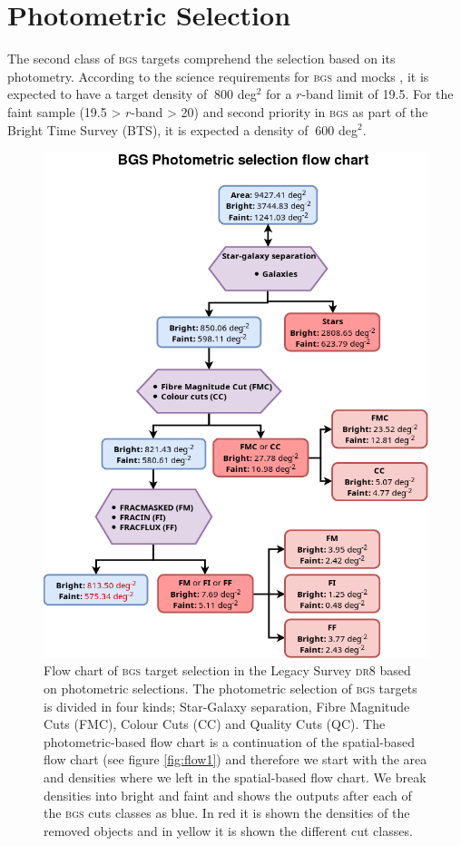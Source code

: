 \documentclass[fleqn,usenatbib]{mnras}
\newcommand{\BGS}{\textsc{bgs}\xspace}
\newcommand{\DReight}{\textsc{dr8}\xspace}
\begin{document}
\section{Photometric Selection}\label{sec:photo_select}

The second class of \BGS targets comprehend the selection based on its photometry. According to the science requirements for \BGS and mocks \citep{Smith:2017tzz}, it is expected to have a target density of $~800$ deg$^{2}$ for a $r$-band limit of 19.5. For the faint sample (19.5 > $r$-band > 20) and second priority in \BGS as part of the Bright Time Survey (BTS), it is expected a density of $~600$ deg$^{2}$.

\begin{figure}
	\includegraphics[width=\columnwidth]{images/flow_phot.png}
    \caption{Flow chart of \BGS target selection in the Legacy Survey \DReight based on photometric selections. The photometric selection of \BGS targets is divided in four kinds; Star-Galaxy separation, Fibre Magnitude Cuts (FMC), Colour Cuts (CC) and Quality Cuts (QC). The photometric-based flow chart is a continuation of the spatial-based flow chart (see figure \ref{fig:flow1}) and therefore we start with the area and densities where we left in the spatial-based flow chart. We break densities into bright and faint and shows the outputs after each of the \BGS cuts classes as blue. In red it is shown the densities of the removed objects and in yellow it is shown the different cut classes.}
    \label{fig:flow2}
\end{figure}
\end{document}
